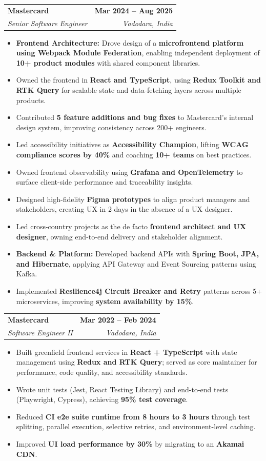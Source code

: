 \documentclass[letterpaper,11pt]{article}
\makeatletter
\newcommand{\resumeItem}[1]{
  \item\small{
    {#1 \vspace{-3pt}}
  }
}
\newcommand{\resumeSubheading}[4]{
  \vspace{-3pt}\item
    \begin{tabular*}{1.0\textwidth}[t]{l@{\extracolsep{\fill}}r}
      \textbf{#1} & \textbf{\small #2} \\
      \textit{\small#3} & \textit{\small #4} \\
    \end{tabular*}\vspace{-7pt}
}
\newcommand{\resumeItemListStart}{\begin{itemize}}
\newcommand{\resumeItemListEnd}{\end{itemize}\vspace{0pt}}
\makeatother
\begin{document}
    \resumeSubheading
      {Mastercard}{Mar 2024 -- Aug 2025}
      {Senior Software Engineer}{Vadodara, India}
      \resumeItemListStart
        \resumeItem{\textbf{Frontend Architecture:} Drove design of a \textbf{microfrontend platform using Webpack Module Federation}, enabling independent deployment of \textbf{10+ product modules} with shared component libraries.}
        \resumeItem{Owned the frontend in \textbf{React and TypeScript}, using \textbf{Redux Toolkit and RTK Query} for scalable state and data-fetching layers across multiple products.}
        \resumeItem{Contributed \textbf{5 feature additions and bug fixes} to Mastercard's internal design system, improving consistency across 200+ engineers.}
        \resumeItem{Led accessibility initiatives as \textbf{Accessibility Champion}, lifting \textbf{WCAG compliance scores by 40\%} and coaching \textbf{10+ teams} on best practices.}
        \resumeItem{Owned frontend observability using \textbf{Grafana and OpenTelemetry} to surface client-side performance and traceability insights.}
        \resumeItem{Designed high-fidelity \textbf{Figma prototypes} to align product managers and stakeholders, creating UX in 2 days in the absence of a UX designer.}
        \resumeItem{Led cross-country projects as the de facto \textbf{frontend architect and UX designer}, owning end-to-end delivery and stakeholder alignment.}
        \resumeItem{\textbf{Backend \& Platform:} Developed backend APIs with \textbf{Spring Boot, JPA, and Hibernate}, applying API Gateway and Event Sourcing patterns using Kafka.}
        \resumeItem{Implemented \textbf{Resilience4j Circuit Breaker and Retry} patterns across 5+ microservices, improving \textbf{system availability by 15\%}.}
      \resumeItemListEnd

    \resumeSubheading
      {Mastercard}{Mar 2022 -- Feb 2024}
      {Software Engineer II}{Vadodara, India}
      \resumeItemListStart
        \resumeItem{Built greenfield frontend services in \textbf{React + TypeScript} with state management using \textbf{Redux and RTK Query}; served as core maintainer for performance, code quality, and accessibility standards.}
        \resumeItem{Wrote unit tests (Jest, React Testing Library) and end-to-end tests (Playwright, Cypress), achieving \textbf{95\% test coverage}.}
        \resumeItem{Reduced \textbf{CI e2e suite runtime from 8 hours to 3 hours} through test splitting, parallel execution, selective retries, and environment-level caching.}
        \resumeItem{Improved \textbf{UI load performance by 30\%} by migrating to an \textbf{Akamai CDN}.}
      \resumeItemListEnd
\end{document}
